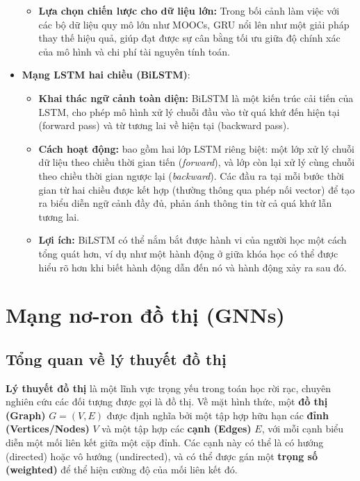 \begin{itemize}
\begin{itemize}
        \item \textbf{Lựa chọn chiến lược cho dữ liệu lớn:} Trong bối cảnh làm việc với các bộ dữ liệu quy mô lớn như MOOCs, GRU nổi lên như một giải pháp thay thế hiệu quả, giúp đạt được sự cân bằng tối ưu giữa độ chính xác của mô hình và chi phí tài nguyên tính toán.
    \end{itemize}

    \item \textbf{Mạng LSTM hai chiều (BiLSTM)}\cite{singla2022ensemble}:
    \begin{itemize}
        \item \textbf{Khai thác ngữ cảnh toàn diện:} BiLSTM là một kiến trúc cải tiến của LSTM, cho phép mô hình xử lý chuỗi đầu vào từ quá khứ đến hiện tại (forward pass) và từ tương lai về hiện tại (backward pass).
        \item \textbf{Cách hoạt động:} bao gồm hai lớp LSTM riêng biệt: một lớp xử lý chuỗi dữ liệu theo chiều thời gian tiến (\textit{forward}), và lớp còn lại xử lý cùng chuỗi theo chiều thời gian ngược lại (\textit{backward}). Các đầu ra tại mỗi bước thời gian từ hai chiều được kết hợp (thường thông qua phép nối vector) để tạo ra biểu diễn ngữ cảnh đầy đủ, phản ánh thông tin từ cả quá khứ lẫn tương lai.
        \item \textbf{Lợi ích:}  BiLSTM có thể nắm bắt được hành vi của người học một cách tổng quát hơn, ví dụ như một hành động ở giữa khóa học có thể được hiểu rõ hơn khi biết hành động dẫn đến nó và hành động xảy ra sau đó. 
    \end{itemize}
\end{itemize}

\section{Mạng nơ-ron đồ thị (GNNs)}

\subsection{Tổng quan về lý thuyết đồ thị}
\textbf{Lý thuyết đồ thị} là một lĩnh vực trọng yếu trong toán học rời rạc, chuyên nghiên cứu các đối tượng được gọi là đồ thị. Về mặt hình thức, một \textbf{đồ thị (Graph)} $G = (V, E)$ được định nghĩa bởi một tập hợp hữu hạn các \textbf{đỉnh (Vertices/Nodes)} $V$ và một tập hợp các \textbf{cạnh (Edges)} $E$, với mỗi cạnh biểu diễn một mối liên kết giữa một cặp đỉnh. Các cạnh này có thể là có hướng (directed) hoặc vô hướng (undirected), và có thể được gán một \textbf{trọng số (weighted)} để thể hiện cường độ của mối liên kết đó.

